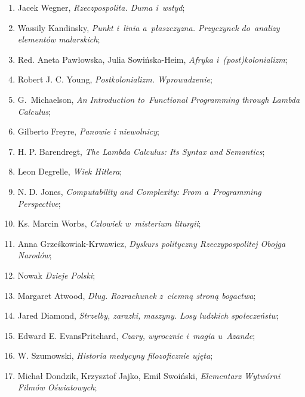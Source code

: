 \documentclass[a4paper,11pt]{article}
\begin{document}
\begin{enumerate}
\item Jacek Wegner, \emph{Rzeczpospolita. Duma i~wstyd};

\item Wassily Kandinsky, \emph{Punkt i~linia a~płaszczyzna. Przyczynek
    do~analizy elementów malarskich};

\item Red. Aneta Pawłowska, Julia Sowińska-Heim, \emph{Afryka
    i~(post)kolonializm};

\item Robert J. C. Young, \emph{Postkolonializm. Wprowadzenie};

\item G.~Michaelson, \emph{An Introduction to~Functional Programming
    through Lambda Calculus};

\item Gilberto Freyre, \emph{Panowie i niewolnicy};

\item H. P. Barendregt, \emph{The Lambda Calculus: Its Syntax and
    Semantics};

\item Leon Degrelle, \emph{Wiek Hitlera};

\item N. D. Jones, \emph{Computability and Complexity: From
    a~Programming Perspective};

\item Ks. Marcin Worbs, \emph{Człowiek w~misterium liturgii};

\item Anna Grześkowiak-Krwawicz, \emph{Dyskurs polityczny
    Rzeczypospolitej Obojga Narodów};

\item Nowak \emph{Dzieje Polski};

\item Margaret Atwood, \emph{Dług. Rozrachunek z~ciemną stroną
    bogactwa};

\item Jared Diamond, \emph{Strzelby, zarazki, maszyny. Losy ludzkich
    społeczeństw};

\item Edward E. Evans\dywiz Pritchard, \emph{Czary, wyrocznie i~magia
    u~Azande};

\item W. Szumowski, \emph{Historia medycyny filozoficznie ujęta};

\item Michał Dondzik, Krzysztof Jajko, Emil Swoiński, \emph{Elementarz
    Wytwórni Filmów Oświatowych};


\end{enumerate}
\end{document}
